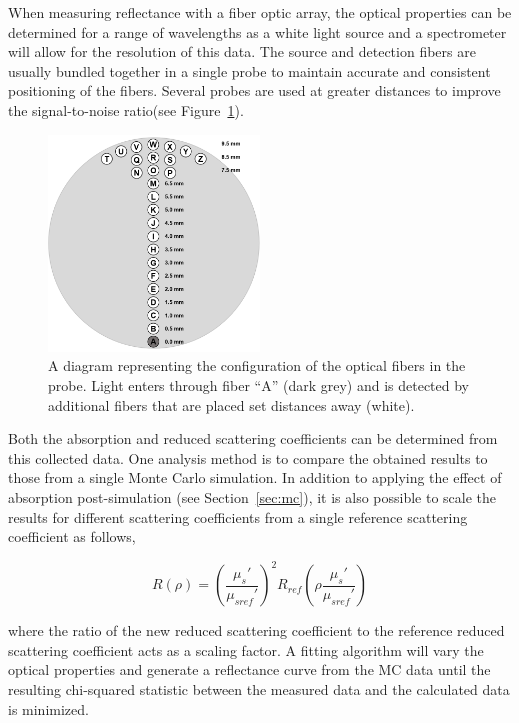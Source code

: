 When measuring reflectance with a fiber optic array, the optical properties can be determined for a range of wavelengths as a white light source and a spectrometer will allow for the resolution of this data. The source and detection fibers are usually bundled together in a single probe to maintain accurate and consistent positioning of the fibers. Several probes are used at greater distances to improve the signal-to-noise ratio(see Figure~\ref{fig:intro-srdr}).

\begin{figure}
	\centering \includegraphics[width=0.5\textwidth]{figures/intro-srdr.png}
	\caption[Probe for spatially-resolved diffuse reflectance]{\label{fig:intro-srdr}A diagram representing the configuration of the optical fibers in the probe. Light enters through fiber “A” (dark grey) and is detected by additional fibers that are placed set distances away (white).}
\end{figure}

Both the absorption and reduced scattering coefficients can be determined from this collected data. One analysis method is to compare the obtained results to those from a single Monte Carlo simulation. In addition to applying the effect of absorption post-simulation (see Section~\ref{sec:mc}), it is also possible to scale the results for different scattering coefficients from a single reference scattering coefficient as follows,\cite{Kienle1996a}

\begin{equation}
	R(\rho) = \left(\frac{\mu_s'}{\mu_{sref}'}\right)^2 R_{ref}\left(\rho\frac{\mu_s'}{\mu_{sref}'}\right)
\end{equation}

\noindent where the ratio of the new reduced scattering coefficient to the reference reduced scattering coefficient acts as a scaling factor. A fitting algorithm will vary the optical properties and generate a reflectance curve from the MC data until the resulting chi-squared statistic between the measured data and the calculated data is minimized.

